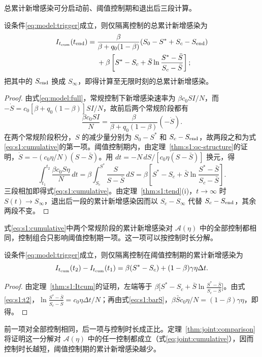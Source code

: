 总累计新增感染可分启动前、阈值控制期和退出后三段计算。
\begin{theorem}
\label{thm:s1:Itcum}
设条件\eqref{eq:model:trigger}成立，则仅隔离控制的总累计新增感染为
\begin{equation}
\begin{split}
I_{t_{\mathrm{cum}}}(t_{\rm end})={}&\frac{\beta}{\beta+q_0(1-\beta)}(S_0-S^*+S_c-S_{\rm end})\\
&+\beta\left[S^*-S_c+\bar S\ln\frac{S^*-\bar S}{S_c-\bar S}\right];
\end{split}
\label{eq:s1:cumulative}
\end{equation}
把其中的 $S_{\rm end}$ 换成 $S_\infty$，即得计算至无限时刻的总累计新增感染。
\end{theorem}
\begin{proof}
由式\eqref{eq:model:full}，常规控制下新增感染速率为 $\beta c_0SI/N$，而 $-\dot S=c_0[\beta+q_0(1-\beta)]SI/N$，故前后两个常规阶段都有
\[
\frac{\beta c_0SI}{N}=\frac{\beta}{\beta+q_0(1-\beta)}(-\dot S).
\]
在两个常规阶段积分，$S$ 的减少量分别为 $S_0-S^*$ 和 $S_c-S_{\rm end}$，故两段之和为式\eqref{eq:s1:cumulative}的第一项。阈值控制期内，由定理~\ref{thm:s1:qc-structure}的证明，$\dot S=-(c_0\eta/N)(S-\bar S)$。用 $dt=-N\,dS/[c_0\eta(S-\bar S)]$ 换元，得
\[
\int_{t_1}^{t_2}\frac{\beta c_0S\eta}{N}\,dt
=\beta\int_{S_c}^{S^*}\frac{S}{S-\bar S}\,dS
=\beta\left[S^*-S_c+\bar S\ln\frac{S^*-\bar S}{S_c-\bar S}\right].
\]
三段相加即得式\eqref{eq:s1:cumulative}。由定理~\ref{thm:s1:tend}(i)，$t\to\infty$ 时 $S(t)\to S_\infty$，退出后一段的累计新增感染因而以 $S_c-S_\infty$ 代替 $S_c-S_{\rm end}$，其余两段不变。
\end{proof}
式\eqref{eq:s1:cumulative}中两个常规阶段的累计新增感染对 $\mathcal A(\eta)$ 中的全部控制都相同，控制组合只影响阈值控制期一项。这一项可以按控制时长分解。
\begin{corollaryn}
\label{cor:s1:threshold-infections}
设条件\eqref{eq:model:trigger}成立，则仅隔离控制在阈值控制期的累计新增感染为
\[
I_{t_{\mathrm{cum}}}(t_2)-I_{t_{\mathrm{cum}}}(t_1)=\beta(S^*-S_c)+(1-\beta)\gamma\eta\Delta t.
\]
\end{corollaryn}
\begin{proof}
由定理~\ref{thm:s1:Itcum}的证明，左端等于 $\beta\bigl[S^*-S_c+\bar S\ln\frac{S^*-\bar S}{S_c-\bar S}\bigr]$。由式\eqref{eq:s1:t2}，$\ln\frac{S^*-\bar S}{S_c-\bar S}=c_0\eta\Delta t/N$；再由式\eqref{eq:s1:barS}，$\beta\bar Sc_0\eta/N=(1-\beta)\gamma\eta$，即得。
\end{proof}
前一项对全部控制相同，后一项与控制时长成正比。定理~\ref{thm:joint:comparison}将证明这一分解对 $\mathcal A(\eta)$ 中的任一控制都成立（式\eqref{eq:joint:cumulative}），因而控制时长越短，阈值控制期的累计新增感染越少。


